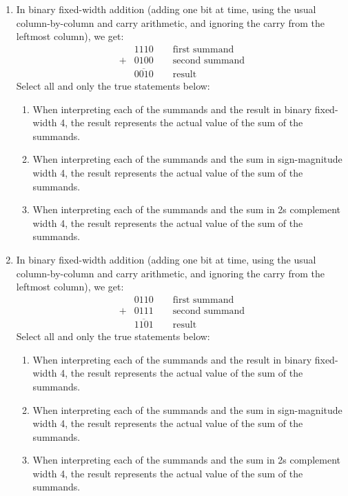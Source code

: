 \documentclass[12pt, oneside]{article}
\begin{document}
\begin{enumerate}
{\begin{enumerate}
    \item In binary fixed-width addition (adding one bit at time, using 
    the usual column-by-column and carry arithmetic, and ignoring the carry 
    from the  leftmost column), we get: 
    \begin{align*}
        &1110  \qquad  \text{first summand}\\
        +&0100 \qquad  \text{second summand}\\
        &\overline{0010} \qquad \text{result}
    \end{align*}
    Select all and only the  true  statements below:
    \begin{enumerate}
        \item When interpreting each of the summands and the result in binary fixed-width 4, 
        the result represents the actual value of the sum of the summands.
        \item When interpreting each of the summands and the sum in sign-magnitude width 4, the result  
        represents the actual value of the sum of the summands.
        \item When interpreting each of the summands and the sum in 2s complement width 4, the result 
        represents the actual value of the sum of the summands.
    \end{enumerate}    
    \item In binary fixed-width addition (adding one bit at time, using the 
    usual column-by-column and carry arithmetic, and ignoring the carry from the 
    leftmost column), we get: 
    \begin{align*}
        &0110  \qquad  \text{first summand}\\
        +&0111 \qquad  \text{second summand}\\
        &\overline{1101} \qquad \text{result}
    \end{align*}
    Select all and only the  true  statements below:
    \begin{enumerate}
        \item When interpreting each of the summands and the result in binary fixed-width 4, 
        the result represents the actual value of the sum of the summands.
        \item When interpreting each of the summands and the sum in sign-magnitude width 4, 
        the result  
        represents the actual value of the sum of the summands.
        \item When interpreting each of the summands and the sum in 2s complement width 4, 
        the result 
        represents the actual value of the sum of the summands.
    \end{enumerate}   
\end{enumerate} }
\end{enumerate}
\newpage
\end{document}
